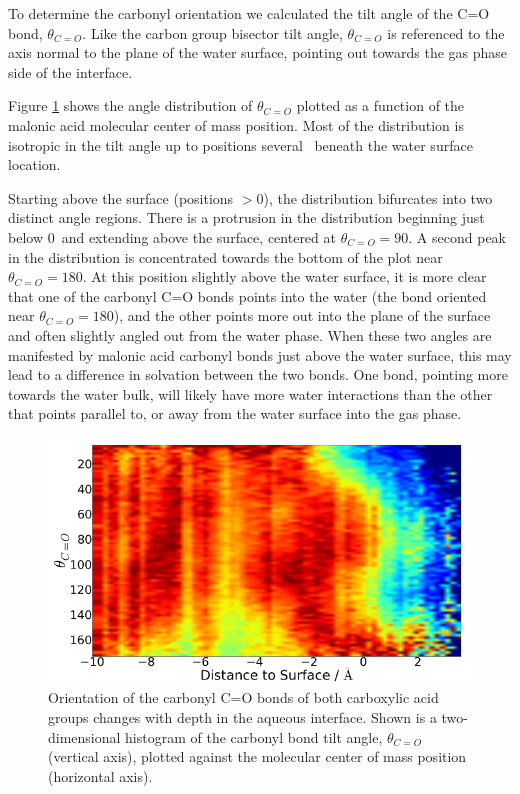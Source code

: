 To determine the carbonyl orientation we calculated the tilt angle of the C=O bond, $\theta_{C=O}$. Like the carbon group bisector tilt angle, $\theta_{C=O}$ is referenced to the axis normal to the plane of the water surface, pointing out towards the gas phase side of the interface.

Figure \ref{fig:carbonyl-tilt} shows the angle distribution of $\theta_{C=O}$ plotted as a function of the malonic acid molecular center of mass position. Most of the distribution is isotropic in the tilt angle up to positions several \angs~beneath the water surface location.

Starting above the surface (positions $>0$\angs), the distribution bifurcates into two distinct angle regions. There is a protrusion in the distribution beginning just below 0\angs~and extending above the surface, centered at $\theta_{C=O}=90$\textdegree. A second peak in the distribution is concentrated towards the bottom of the plot near $\theta_{C=O}=180$\textdegree. At this position slightly above the water surface, it is more clear that one of the carbonyl C=O bonds points into the water (the bond oriented near $\theta_{C=O}=180$\textdegree), and the other points more out into the plane of the surface and often slightly angled out from the water phase.  When these two angles are manifested by malonic acid carbonyl bonds just above the water surface, this may lead to a difference in solvation between the two bonds. One bond, pointing more towards the water bulk, will likely have more water interactions than the other that points parallel to, or away from the water surface into the gas phase.


\begin{figure}[h!]
	\begin{center}
		\includegraphics[scale=1.0]{images/malonic-angles/carbonyl-theta-distance.png}
		\caption{Orientation of the carbonyl C=O bonds of both carboxylic acid groups changes with depth in the aqueous interface. Shown is a two-dimensional histogram of the carbonyl bond tilt angle, $\theta_{C=O}$ (vertical axis), plotted against the molecular center of mass position (horizontal axis).}  
		\label{fig:carbonyl-tilt}
	\end{center}
\end{figure}

